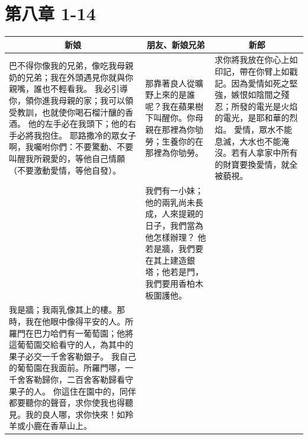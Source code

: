 \section{第八章    1-14}
\begin{table}[H]
\centering
\begin{tabular}{p{6.5cm}|p{5.0cm}|p{6.0cm}}\hline\hline
\multicolumn{1}{c|}{新娘}&\multicolumn{1}{c|}{朋友、新娘兄弟}&\multicolumn{1}{c}{新郎}\\\hline
巴不得你像我的兄弟，像吃我母親奶的兄弟；我在外頭遇見你就與你親嘴，誰也不輕看我。
我必引導你，領你進我母親的家；我可以領受教訓，也就使你喝石榴汁釀的香酒。
他的左手必在我頭下；他的右手必將我抱住。
耶路撒冷的眾女子啊，我囑咐你們：不要驚動、不要叫醒我所親愛的，等他自己情願（不要激動愛情，等他自發）。
&那靠著良人從曠野上來的是誰呢？我在蘋果樹下叫醒你。你母親在那裡為你劬勞；生養你的在那裡為你劬勞。
&求你將我放在你心上如印記，帶在你臂上如戳記。因為愛情如死之堅強，嫉恨如陰間之殘忍；所發的電光是火焰的電光，是耶和華的烈焰。
愛情，眾水不能息滅，大水也不能淹沒。若有人拿家中所有的財寶要換愛情，就全被藐視。\\\hline
&我們有一小妹；他的兩乳尚未長成，人來提親的日子，我們當為他怎樣辦理？
他若是牆，我們要在其上建造銀塔；他若是門，我們要用香柏木板圍護他。
&\\\hline
我是牆；我兩乳像其上的樓。那時，我在他眼中像得平安的人。所羅門在巴力哈們有一葡萄園；他將這葡萄園交給看守的人，為其中的果子必交一千舍客勒銀子。
我自己的葡萄園在我面前。所羅門哪，一千舍客勒歸你，二百舍客勒歸看守果子的人。
你這住在園中的，同伴都要聽你的聲音，求你使我也得聽見。我的良人哪，求你快來！如羚羊或小鹿在香草山上。&&\\\hline
\end{tabular}
\end{table}
